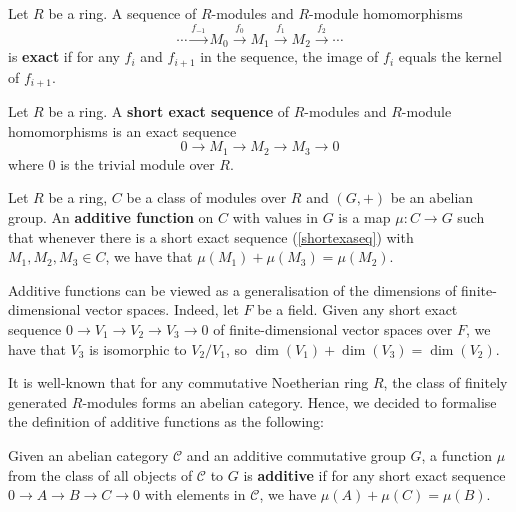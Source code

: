 \begin{definition}
\label{exactseq}
Let $R$ be a ring. A sequence of $R$-modules and $R$-module homomorphisms
\begin{equation}
\cdots\stackrel{f_{-1}}{\rightarrow}M_0\stackrel{f_0}{\rightarrow}M_1\stackrel{f_1}{\rightarrow}M_2\stackrel{f_2}{\rightarrow}\cdots
\end{equation}
is \textbf{exact} if for any $f_i$ and $f_{i+1}$ in the sequence, the image of $f_{i}$ equals the kernel of $f_{i+1}$.
\end{definition}

\begin{definition}
\label{shortexactseq}
Let $R$ be a ring. A \textbf{short exact sequence} of $R$-modules and $R$-module homomorphisms is an exact sequence
\begin{equation}
\label{shortexaseq}
0{\rightarrow}M_1{\rightarrow}M_2{\rightarrow}M_3{\rightarrow}0
\end{equation}
where $0$ is the trivial module over $R$.
\end{definition}

\begin{definition}
\label{moduleaddfunc}
Let $R$ be a ring, $C$ be a class of modules over $R$ and $(G,+)$ be an abelian group. An \textbf{additive function} on $C$ with values in $G$ is a map $\mu:C\rightarrow{G}$ such that whenever there is a short exact sequence (\ref{shortexaseq}) with $M_1,M_2,M_3\in{C}$, we have that $\mu(M_1)+\mu(M_3)=\mu(M_2)$.
\end{definition}

Additive functions can be viewed as a generalisation of the dimensions of finite-dimensional vector spaces. Indeed, let $F$ be a field. Given any short exact sequence $0\rightarrow{V_1}\rightarrow{V_2}\rightarrow{V_3}\rightarrow{0}$ of finite-dimensional vector spaces over $F$, we have that $V_3$ is isomorphic to $V_2/V_1$, so $\operatorname{dim}(V_1)+\operatorname{dim}(V_3)=\operatorname{dim}(V_2)$.

It is well-known that for any commutative Noetherian ring $R$, the class of finitely generated $R$-modules forms an abelian category. Hence, we decided to formalise the definition of additive functions as the following:

\begin{definition}
\label{abeliancataddfunc}
\leanok
Given an abelian category $\mathcal{C}$ and an additive commutative group $G$, a function $\mu$ from the class of all objects of $\mathcal{C}$ to $G$ is \textbf{additive} if for any short exact sequence $0\rightarrow{A}\rightarrow{B}\rightarrow{C}\rightarrow{0}$ with elements in $\mathcal{C}$, we have $\mu(A)+\mu(C)=\mu(B)$.
\end{definition}


